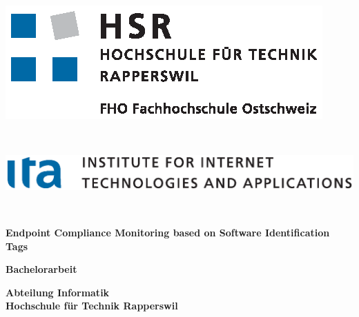 
\begin{titlepage}


	\thispagestyle{empty} %

 


\begin{minipage}{0.4\textwidth}
	\begin{flushleft} \large
 		\includegraphics[scale=0.9]{images/hsrlogo}
 	\end{flushleft}
\end{minipage}
 ~
\begin{minipage}{0.4\textwidth}
	\begin{flushright} \large
		\includegraphics[scale=0.5]{images/italogo}
	\end{flushright}
\end{minipage}\\[2cm]

\vspace{80pt}

\begin{center}
{ \huge \bfseries Endpoint Compliance Monitoring based on Software Identification Tags}\\[0.9cm] 
\end{center}

\begin{center}
{ \huge \bfseries Bachelorarbeit}\\[0.9cm] 
\end{center}
 
 
 \begin{center}
 { \LARGE \bfseries Abteilung Informatik\\Hochschule für Technik Rapperswil}\\[0.9cm] 
 \end{center}
 

\end{titlepage}
